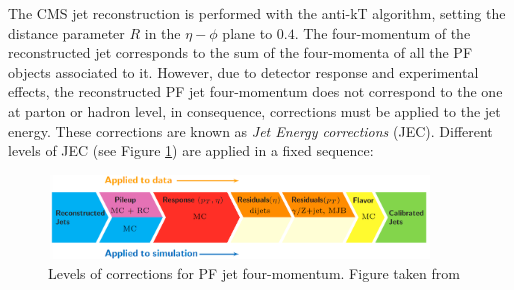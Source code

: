 \noindent The CMS jet reconstruction is performed with the anti-kT algorithm, setting 
the distance parameter $R$ in the $\eta-\phi$ plane to $0.4$. The four-momentum of the 
reconstructed jet corresponds to the sum of the four-momenta of all 
the PF objects associated to it. However, 
due to detector response and experimental effects, the 
reconstructed PF jet four-momentum does not correspond to the one
at parton or hadron level, in consequence, corrections must be applied
to the jet energy. These corrections are known as 
\textit{Jet Energy corrections} (JEC). Different levels of JEC 
(see Figure \ref{fig:JEC_levels}) are applied in a fixed sequence: \\

\begin{figure}[ht]%
  \begin{center}
    \includegraphics[width=0.9\textwidth]{figuras/Chapter3/JEC_levels.png}
    \caption{Levels of corrections for PF jet four-momentum. Figure taken from \cite{JESandJER}}
    \label{fig:JEC_levels}
  \end{center}
\end{figure}
